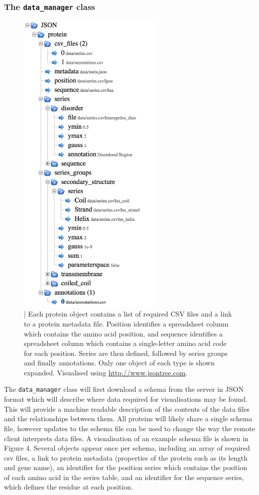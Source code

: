 \documentclass[fleqn,10pt]{article} %
\begin{document}
\subsubsection{The \texttt{data\_manager} class}

\begin{figure}
\includegraphics[width=7cm]{figs/schema}
\caption{ | Each protein object contains a list of required CSV files and a link to a protein metadata file. Position identifies a spreadsheet column which contains the amino acid position, and sequence identifies a spreadsheet column which contains a single-letter amino acid code for each position. Series are then defined, followed by series groups and finally annotations. Only one object of each type is shown expanded. Visualised using \url{http://www.jsontree.com}.}
\end{figure}

The \texttt{data\_manager} class will first download a schema from the server in JSON format which will describe where data required for visualisations may be found. This will provide a machine readable description of the contents of the data files and the relationships between them. All proteins will likely share a single schema file, however updates to the schema file can be used to change the way the remote client interprets data files. A visualisation of an example schema file is shown in Figure 4. Several objects appear once per schema, including an array of required csv files, a link to protein metadata (properties of the protein such as its length and gene name), an identifier for the position series which contains the position of each amino acid in the series table, and an identifier for the sequence series, which defines the residue at each position.
\end{document}
